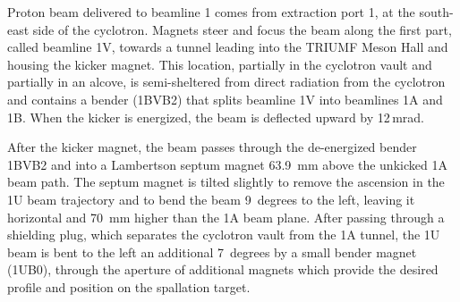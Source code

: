 \documentclass[aps,prab,twocolumn,superscriptaddress]{revtex4-1}
\begin{document}
Proton beam delivered to beamline 1 comes from extraction port 1, at the south-east side of the cyclotron.  %
Magnets steer and focus the beam along the first part, called beamline 1V, towards a tunnel leading into the TRIUMF Meson Hall and housing the kicker magnet.  This location, partially in the cyclotron vault and partially in an alcove, is semi-sheltered from direct radiation from the cyclotron and contains a bender (1BVB2) that splits beamline 1V into beamlines 1A and 1B.
When the kicker is energized, the beam is deflected upward by 12\,mrad.

After the kicker magnet, the beam passes through the de-energized bender 1BVB2 and into a Lambertson septum magnet 63.9~mm above the unkicked 1A beam path. %
The septum magnet is tilted slightly to remove the ascension in the 1U beam trajectory and to bend the beam 9~degrees to the left, leaving it horizontal and 70~mm higher than the 1A beam plane.  After passing through a shielding plug, which  separates the cyclotron vault from the 1A tunnel, the 1U beam is bent to the left an additional 7~degrees by a small bender magnet (1UB0), through the aperture of additional magnets which provide the desired profile and position on the spallation target.
\end{document}
